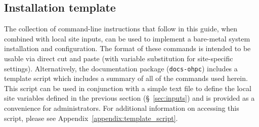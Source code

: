 \subsection{Installation template}
The collection of command-line instructions that follow in this guide, when
combined with local site inputs, can be used to implement a 
bare-metal system installation and configuration. The format of these commands
is intended to be usable via direct cut and paste (with variable substitution
for site-specific settings). Alternatively, the \OHPC{} documentation package
(\texttt{docs-ohpc}) includes a template script which includes a summary of all 
of the commands used herein. This script can be used in conjunction with a 
simple text file to define the local site variables defined in the previous 
section (\S~\ref{sec:inputs}) and is provided as a convenience for 
administrators. For additional information on accessing this script, please see
Appendix~\ref{appendix:template_script}.


